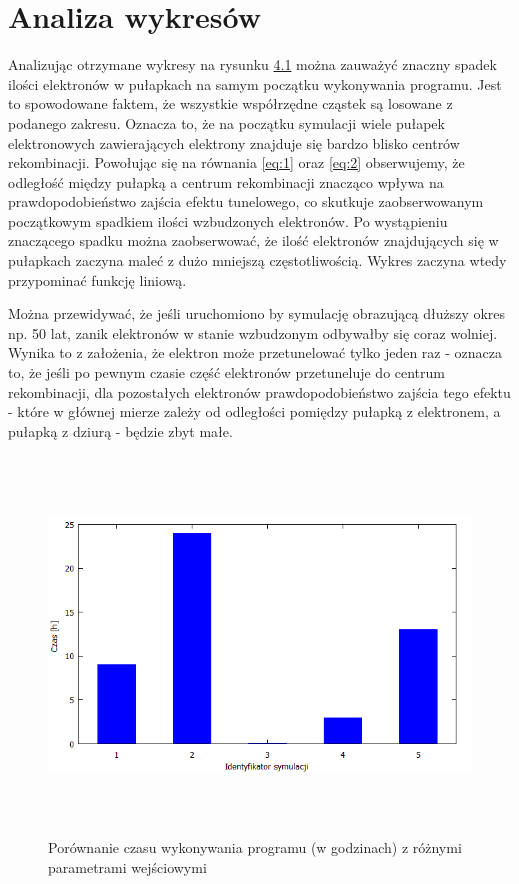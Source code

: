 \section{Analiza wykresów}
Analizując otrzymane wykresy  na rysunku \hyperref[rys:1]{4.1} można zauważyć znaczny spadek ilości elektronów w pułapkach na samym początku wykonywania programu. Jest to spowodowane faktem, że wszystkie współrzędne cząstek są losowane z podanego zakresu. Oznacza to, że na początku symulacji wiele pułapek elektronowych zawierających elektrony znajduje się bardzo blisko centrów rekombinacji. Powołując się na równania \ref{eq:1} oraz \ref{eq:2} obserwujemy, że odległość między pułapką a centrum rekombinacji znacząco wpływa na prawdopodobieństwo zajścia efektu tunelowego, co skutkuje zaobserwowanym początkowym spadkiem ilości wzbudzonych elektronów. Po wystąpieniu znaczącego spadku można zaobserwować, że ilość elektronów znajdujących się w pułapkach zaczyna maleć z dużo mniejszą częstotliwością. Wykres zaczyna wtedy przypominać funkcję liniową. 

Można przewidywać, że jeśli uruchomiono by symulację obrazującą dłuższy okres np. 50 lat, zanik elektronów w stanie wzbudzonym odbywałby się coraz wolniej. Wynika to z założenia, że elektron może przetunelować tylko jeden raz - oznacza to, że jeśli po pewnym czasie część elektronów przetuneluje do centrum rekombinacji, dla pozostałych elektronów prawdopodobieństwo zajścia tego efektu - które w głównej mierze zależy od odległości pomiędzy pułapką z elektronem, a pułapką z dziurą - będzie zbyt małe.

\begin{figure}[H]
\centering
\includegraphics[width=17cm, height = 10cm]{czas}
\caption{Porównanie czasu wykonywania programu (w godzinach) z różnymi parametrami wejściowymi}
\label{rys:2}
\end{figure}

